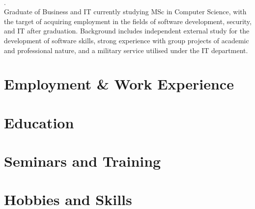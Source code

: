 \documentclass{template}
\begin{document}
\thispagestyle{empty}
\pagestyle{fancy}

\centering

\\
.
\\
\justify
Graduate of Business and IT currently studying MSc in Computer Science, with the target of acquiring employment in the fields of software development, security, and IT after graduation. Background includes independent external study for the development of software skills, strong experience with group projects of academic and professional nature, and a military service utilised under the IT department.

\section{Employment \& Work Experience}


\section{Education}


\section{Seminars and Training}


\section{Hobbies and Skills}

\end{document}
